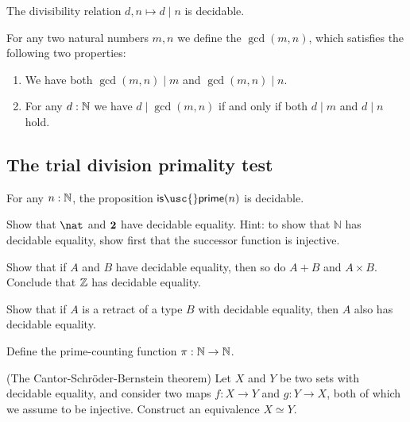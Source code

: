\begin{lem}
  The divisibility relation $d,n\mapsto d\mid n$ is decidable.
\end{lem}

\begin{defn}
  For any two natural numbers $m,n$ we define the  $\gcd(m,n)$, which satisfies the following two properties:
  \begin{enumerate}
  \item We have both $\gcd(m,n)\mid m$ and $\gcd(m,n)\mid n$.
  \item For any $d:\mathbb{N}$ we have $d\mid \gcd(m,n)$ if and only if both $d\mid m$ and $d\mid n$ hold.
  \end{enumerate}
\end{defn}

\subsection{The trial division primality test}

\begin{thm}
  For any $n:\mathbb{N}$, the proposition $\mathsf{is\usc{}prime}(n)$ is decidable.
\end{thm}


\begin{exercises}
\item
  \begin{subexenum}
  \item Show that $\nat$ and $\mathbf{2}$ have decidable equality. Hint: to show that $\mathbb{N}$ has decidable equality, show first that the successor function is injective.
  \item Show that if $A$ and $B$ have decidable equality, then so do $A+B$ and $A\times B$. Conclude that $\mathbb{Z}$ has decidable equality.
  \item Show that if $A$ is a retract of a type $B$ with decidable equality, then $A$ also has decidable equality.
  \end{subexenum}
\item Define the prime-counting function $\pi:\mathbb{N}\to\mathbb{N}$.
\item (The Cantor-Schr\"oder-Bernstein theorem) Let $X$ and $Y$ be two sets with decidable equality, and consider two maps $f:X\to Y$ and $g:Y\to X$, both of which we assume to be injective. Construct an equivalence $X\simeq Y$.
\end{exercises}
